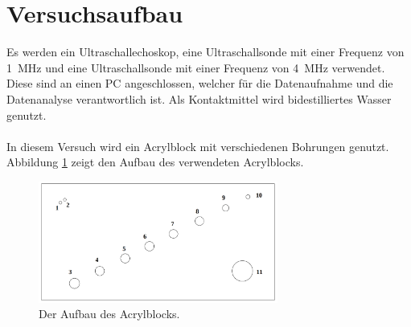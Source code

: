 \documentclass[
  bibliography=totoc,     %
  captions=tableheading,  %
  titlepage=firstiscover, %
]{scrartcl}
\begin{document}
\section{Versuchsaufbau}
\label{sec:aufbau}
Es werden ein Ultraschallechoskop, eine Ultraschallsonde mit einer Frequenz von
\SI{1}{\mega\hertz} und eine Ultraschallsonde mit einer Frequenz von
\SI{4}{\mega\hertz} verwendet. Diese sind an einen PC angeschlossen, welcher
für die Datenaufnahme und die Datenanalyse verantwortlich ist. Als
Kontaktmittel wird bidestilliertes Wasser genutzt.\\
\\
In diesem Versuch wird ein Acrylblock mit verschiedenen Bohrungen genutzt.
Abbildung \ref{fig:US21} zeigt den Aufbau des verwendeten Acrylblocks.
\begin{figure}[H]
  \centering
  \includegraphics[width=0.7\textwidth]{US21.png}
  \caption{Der Aufbau des Acrylblocks. \cite{anleitung}}
  \label{fig:US21}
\end{figure}
\end{document}
